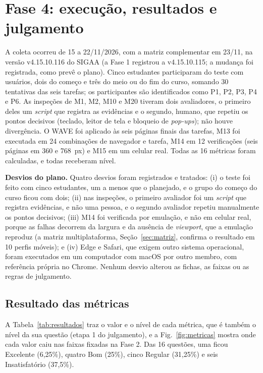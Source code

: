 \section{Fase 4: execução, resultados e julgamento}
\label{sec:fase4}

A coleta ocorreu de 15 a 22/11/2026, com a matriz complementar em 23/11, na versão v4.15.10.116 do SIGAA (a Fase 1 registrou a v4.15.10.115; a mudança foi registrada, como prevê o plano). Cinco estudantes participaram do teste com usuários, dois do começo e três do meio ou do fim do curso, somando 30 tentativas das seis tarefas; os participantes são identificados como P1, P2, P3, P4 e P6. As inspeções de M1, M2, M10 e M20 tiveram dois avaliadores, o primeiro deles um \textit{script} que registra as evidências e o segundo, humano, que repetiu os pontos decisivos (teclado, leitor de tela e bloqueio de \textit{pop-ups}); não houve divergência. O WAVE foi aplicado às seis páginas finais das tarefas, M13 foi executada em 24 combinações de navegador e tarefa, M14 em 12 verificações (seis páginas em 360 e 768~px) e M15 em um celular real. Todas as 16 métricas foram calculadas, e todas receberam nível.

\textbf{Desvios do plano.} Quatro desvios foram registrados e tratados: (i) o teste foi feito com cinco estudantes, um a menos que o planejado, e o grupo do começo do curso ficou com dois; (ii) nas inspeções, o primeiro avaliador foi um \textit{script} que registra evidências, e não uma pessoa, e o segundo avaliador repetiu manualmente os pontos decisivos; (iii) M14 foi verificada por emulação, e não em celular real, porque as falhas decorrem da largura e da ausência de \textit{viewport}, que a emulação reproduz (a matriz multiplataforma, Seção~\ref{sec:matriz}, confirma o resultado em 10 perfis móveis); e (iv) Edge e Safari, que exigem outro sistema operacional, foram executados em um computador com macOS por outro membro, com referência própria no Chrome. Nenhum desvio alterou as fichas, as faixas ou as regras de julgamento.

\subsection{Resultado das métricas}

A Tabela~\ref{tab:resultados} traz o valor e o nível de cada métrica, que é também o nível da sua questão (etapa 1 do julgamento), e a Fig.~\ref{fig:metricas} mostra onde cada valor caiu nas faixas fixadas na Fase 2. Das 16 questões, uma ficou Excelente (6,25\%), quatro Bom (25\%), cinco Regular (31,25\%) e seis Insatisfatório (37,5\%).

